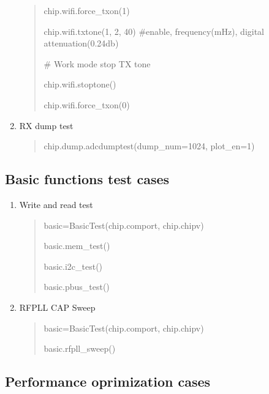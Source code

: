 \documentclass[letterpaper,10pt,english]{sphinxhowto}
\begin{document}
\begin{enumerate}
\begin{quote}
chip.wifi.force\_txon(1)

chip.wifi.txtone(1, 2, 40)   \#enable, frequency(mHz), digital attenuation(0.24db)

\# Work mode stop TX tone

chip.wifi.stoptone()

chip.wifi.force\_txon(0)
\end{quote}

\item {} 
RX dump test
\begin{quote}

chip.dump.adcdumptest(dump\_num=1024, plot\_en=1)
\end{quote}

\end{enumerate}


\subsection{Basic functions test cases}
\label{\detokenize{quick_start/quick_start:basic-functions-test-cases}}\begin{enumerate}
\def\theenumi{\arabic{enumi}}
\def\labelenumi{\theenumi .}
\makeatletter\def\p@enumii{\p@enumi \theenumi .}\makeatother
\item {} 
Write and read test
\begin{quote}

basic=BasicTest(chip.comport, chip.chipv)

basic.mem\_test()

basic.i2c\_test()

basic.pbus\_test()
\end{quote}

\item {} 
RFPLL CAP Sweep
\begin{quote}

basic=BasicTest(chip.comport, chip.chipv)

basic.rfpll\_sweep()
\end{quote}

\end{enumerate}


\subsection{Performance oprimization cases}
\label{\detokenize{quick_start/quick_start:performance-oprimization-cases}}
\end{document}
